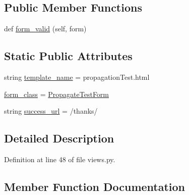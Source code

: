 \subsection*{Public Member Functions}
\begin{DoxyCompactItemize}
\item 
def \hyperlink{class_ground_segment_1_1views_1_1views_1_1_propagation_test_view_a0328f6298714fe6ea104f16334c42290}{form\+\_\+valid} (self, form)
\end{DoxyCompactItemize}
\subsection*{Static Public Attributes}
\begin{DoxyCompactItemize}
\item 
string \hyperlink{class_ground_segment_1_1views_1_1views_1_1_propagation_test_view_a19a8c615613c614967f691e639409b02}{template\+\_\+name} = \textquotesingle{}propagation\+Test.\+html\textquotesingle{}
\item 
\hyperlink{class_ground_segment_1_1views_1_1views_1_1_propagation_test_view_aab4a2cc5ea25d51dedc7d8ea702d8eeb}{form\+\_\+class} = \hyperlink{class_ground_segment_1_1forms_1_1_propagate_test_form}{Propagate\+Test\+Form}
\item 
string \hyperlink{class_ground_segment_1_1views_1_1views_1_1_propagation_test_view_a680c962c400e2f2cd2a284b7cdf6efcc}{success\+\_\+url} = \textquotesingle{}/thanks/\textquotesingle{}
\end{DoxyCompactItemize}


\subsection{Detailed Description}


Definition at line 48 of file views.\+py.



\subsection{Member Function Documentation}
\hypertarget{class_ground_segment_1_1views_1_1views_1_1_propagation_test_view_a0328f6298714fe6ea104f16334c42290}{}
